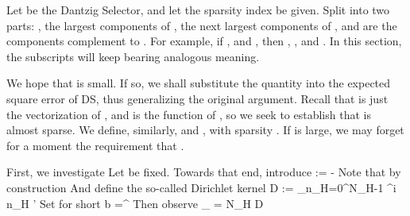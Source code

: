 \startsection [title={Almost-Sparsity of Angular Channel Response}]
\startsubsection [title={Norm of Array Response}]

Let  be the Dantzig Selector, and let the sparsity index  be given.
Split  into two parts: , the largest  components of ,  the next  largest components of , and  are the components complement to .
For example, if , and , then , , and .
In this section, the subscripts  will keep bearing analogous meaning.

We hope that  is small.
If so, we shall substitute the quantity into the expected square error of DS, thus generalizing the original argument.
Recall that  is just the vectorization of , and  is the function of , so we seek to establish that  is almost sparse.
We define, similarly,  and , with sparsity .
If  is large, we may forget for a moment the requirement that .

First, we investigate
%
%
Let \m {\f} be fixed.
Towards that end, introduce
%
 {
\NC \psi {}
:=\NC {} \;
\; \RB {2\pi}
- \pi \NR
}
%
Note that by construction
%
 {
\NC {}
\leq \NC \pi \NR
}
%
And define the so-called Dirichlet kernel
%
 {
\NC D 
:= \NC \sum_{n_H=0}^{N_H-1} ^{i n_H \psi'} \NR
}
%
Set for short
%
 {
\NC b \SB {\f}
=\NC {}^\Adj {} \SB {\f} \NR
}
%
Then observe
%
 {
\NC {} _{}
=\NC {} {N_H} D  \NR
}

